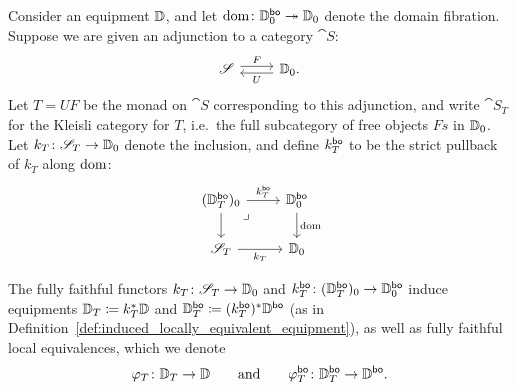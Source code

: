 \documentclass[11pt,oneside,article]{memoir}
\begin{document}
Consider an equipment $\mathbb{D}$, and let $\operatorname{dom}\colon\mathbb{D}_0^{\mathsf{bo}}\twoheadrightarrow\mathbb{D}_0$ denote the domain fibration. Suppose we are given an adjunction to a category $\cat{S}$:
\begin{equation*}
   \Adjoint{\cat{S}}{\dcat{D}_0.}{F}{U}
\end{equation*}
Let $T=UF$ be the monad on $\cat{S}$ corresponding to this adjunction, and write $\cat{S}_T$ for the Kleisli category for $T$, i.e.\ the full subcategory of free objects $Fs$ in $\mathbb{D}_0$. Let $k_T\colon\mathscr{S}_T\to\mathbb{D}_0$ denote the inclusion, and define $k_T^{\mathsf{bo}}$ to be the strict pullback of $k_T$ along $\operatorname{dom}$:
   \[ \begin{tikzcd}
      (\dcat{D}_T^{\bo})_0 \ar[d] \ar[dr,phantom,"\lrcorner" very near start] \ar[r,"k_T^{\bo}"]
         &\dcat{D}_0^{\bo} \ar[d,"\dom"] \\
     \cat{S}_T \ar[r,"k_T"']
         & \dcat{D}_0
   \end{tikzcd} \]

\begin{definition}
   \label{def:kleisli_equipment}
The fully faithful functors $k_T\colon\mathscr{S}_T\to\mathbb{D}_0$ and $k_T^{\mathsf{bo}}\colon(\mathbb{D}_T^{\mathsf{bo}})_0\to\mathbb{D}_0^{\mathsf{bo}}$ induce equipments $\mathbb{D}_T\coloneqq k_T^*\mathbb{D}$ and $\mathbb{D}_T^{\mathsf{bo}}\coloneqq (k_T^{\mathsf{bo}})^*\mathbb{D}^{\mathsf{bo}}$ (as in Definition~\ref{def:induced_locally_equivalent_equipment}), as well as fully faithful local equivalences, which we denote
   \begin{equation}
      \label{eqn:FFLE_DT}
      \varphi_T\colon \mathbb{D}_T\to\mathbb{D}
      \qquad\textnormal{and}\qquad
      \varphi_T^{\mathsf{bo}}\colon \mathbb{D}_T^{\mathsf{bo}}\to\mathbb{D}^{\mathsf{bo}}.
   \end{equation}
\end{definition}
\end{document}
